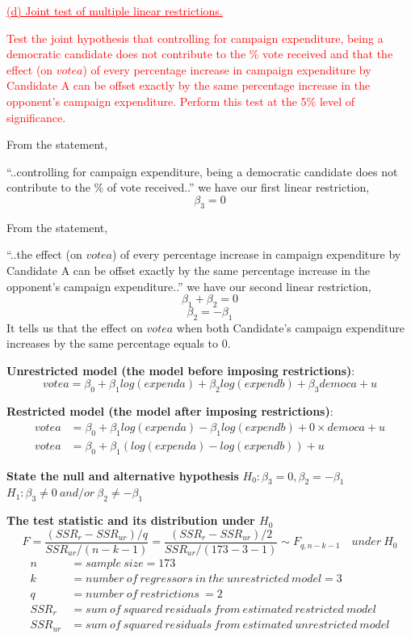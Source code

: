 \documentclass[12pt]{report}
\begin{document}
\newpage
\noindent \textcolor{red}
{
	\uline{(d) Joint test of multiple linear restrictions.}
}

\noindent \textcolor{red}
{
	Test the joint hypothesis that controlling for campaign expenditure, being a democratic candidate does not contribute to the \% vote received and that the effect (on $votea$) of every percentage increase in campaign expenditure by Candidate A can be offset exactly by the same percentage increase in the opponent’s campaign expenditure. Perform this test at the 5\% level of significance.
}

\noindent From the statement,

\centering
“..controlling for campaign expenditure, being a democratic candidate does not contribute to the \% of vote received..”
\vspace{-\baselineskip}
\justify
we have our first linear restriction,
$$\beta_3 = 0$$

\noindent From the statement,

\centering
“..the effect (on $votea$) of every percentage increase in campaign expenditure by Candidate A can be offset exactly by the same percentage increase in the opponent’s campaign expenditure..”
\vspace{-\baselineskip}
\justify
we have our second linear restriction,
$$\beta_1 + \beta_2 = 0$$
$$\beta_2 = -\beta_1$$
\noindent It tells us that the effect on $votea$ when both Candidate's campaign expenditure increases by the same percentage equals to 0.
\vspace{10mm}

\noindent \textbf{Unrestricted model (the model before imposing restrictions)}:
$$votea = \beta_0 + \beta_1log(expenda) + \beta_2log(expendb) + \beta_3democa + u$$

\noindent \textbf{Restricted model (the model after imposing restrictions)}:
\begin{align*}
	votea &= \beta_0 + \beta_1log(expenda) - \beta_1log(expendb) + 0{\times}democa + u \\
	votea &= \beta_0 + \beta_1(log(expenda) - log(expendb)) + u
\end{align*}

\newpage
\noindent \textbf{State the null and alternative hypothesis}
\justify
$H_0: \beta_3 = 0, \beta_2 = -\beta_1$
\justify
$H_1: \beta_3 \neq 0\ and/or\ \beta_2 \neq -\beta_1 $
\vspace{5mm}

\noindent \textbf{The test statistic and its distribution under $H_0$}
$$F = \dfrac{(SSR_r - SSR_{ur})/q}{SSR_{ur}/(n-k-1)} = \dfrac{(SSR_r - SSR_{ur})/2}{SSR_{ur}/(173-3-1)} \sim F_{q,n-k-1} \quad under\ H_0$$
\begin{align*}
n &= sample\ size = 173 \\
k &= number\ of\ regressors\ in\ the\ unrestricted\ model = 3 \\
q &= number\ of\ restrictions\ = 2 \\
SSR_{r} &= sum\ of\ squared\ residuals\ from\ estimated\ restricted\ model \\
SSR_{ur} &= sum\ of\ squared\ residuals\ from\ estimated\ unrestricted\ model
\end{align*}
\end{document}
